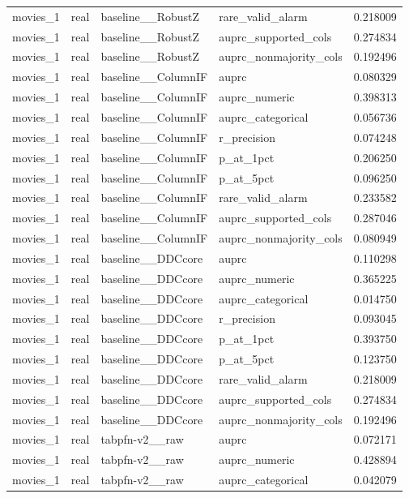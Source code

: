 \begin{tabular}{lllll}
movies\_1 & real & baseline\_\_RobustZ & rare\_valid\_alarm & 0.218009 \\
movies\_1 & real & baseline\_\_RobustZ & auprc\_supported\_cols & 0.274834 \\
movies\_1 & real & baseline\_\_RobustZ & auprc\_nonmajority\_cols & 0.192496 \\
movies\_1 & real & baseline\_\_ColumnIF & auprc & 0.080329 \\
movies\_1 & real & baseline\_\_ColumnIF & auprc\_numeric & 0.398313 \\
movies\_1 & real & baseline\_\_ColumnIF & auprc\_categorical & 0.056736 \\
movies\_1 & real & baseline\_\_ColumnIF & r\_precision & 0.074248 \\
movies\_1 & real & baseline\_\_ColumnIF & p\_at\_1pct & 0.206250 \\
movies\_1 & real & baseline\_\_ColumnIF & p\_at\_5pct & 0.096250 \\
movies\_1 & real & baseline\_\_ColumnIF & rare\_valid\_alarm & 0.233582 \\
movies\_1 & real & baseline\_\_ColumnIF & auprc\_supported\_cols & 0.287046 \\
movies\_1 & real & baseline\_\_ColumnIF & auprc\_nonmajority\_cols & 0.080949 \\
movies\_1 & real & baseline\_\_DDCcore & auprc & 0.110298 \\
movies\_1 & real & baseline\_\_DDCcore & auprc\_numeric & 0.365225 \\
movies\_1 & real & baseline\_\_DDCcore & auprc\_categorical & 0.014750 \\
movies\_1 & real & baseline\_\_DDCcore & r\_precision & 0.093045 \\
movies\_1 & real & baseline\_\_DDCcore & p\_at\_1pct & 0.393750 \\
movies\_1 & real & baseline\_\_DDCcore & p\_at\_5pct & 0.123750 \\
movies\_1 & real & baseline\_\_DDCcore & rare\_valid\_alarm & 0.218009 \\
movies\_1 & real & baseline\_\_DDCcore & auprc\_supported\_cols & 0.274834 \\
movies\_1 & real & baseline\_\_DDCcore & auprc\_nonmajority\_cols & 0.192496 \\
movies\_1 & real & tabpfn-v2\_\_raw & auprc & 0.072171 \\
movies\_1 & real & tabpfn-v2\_\_raw & auprc\_numeric & 0.428894 \\
movies\_1 & real & tabpfn-v2\_\_raw & auprc\_categorical & 0.042079 \\

\end{tabular}
